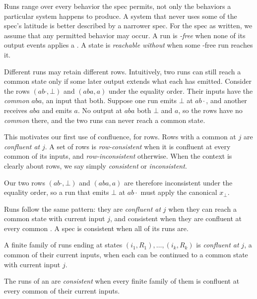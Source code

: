 Runs range over every behavior the spec permits, not only the behaviors a
particular system happens to produce.  A system that never uses some of the
spec's latitude is better described by a narrower spec.  For the spec as
written, we assume that any permitted behavior may occur.  A run is
\emph{\commitment-free} when none of its output events applies a
\commitment.  A state is \emph{reachable without \commitment} when some
\commitment-free run reaches it.

Different runs may retain different rows.  Intuitively, two runs can still
reach a common state only if some later output extends what each has emitted.
Consider the rows $(ab\cdot,\bot)$ and $(aba,a)$ under the equality order.
Their inputs have the \emph{common \indesc} $aba$, an input that \inrel both.
Suppose one run emits $\bot$ at $ab\cdot$, and another receives $aba$ and
emits $a$.  No output at $aba$ \outrel both $\bot$ and $a$, so the rows have
no \emph{common \outnoun} there, and the two runs can never reach a common
state.

This motivates our first use of confluence, for rows.  Rows with a common
\outnoun at $j$ are \emph{confluent at} $j$.  A set of rows is
\emph{row-consistent} when it is confluent at every common \indesc of its
inputs, and \emph{row-inconsistent} otherwise.  When the context is clearly
about rows, we say simply \emph{consistent} or \emph{inconsistent}.

Our two rows $(ab\cdot,\bot)$ and $(aba,a)$ are therefore inconsistent under the
equality order, so a run that emits $\bot$ at $ab\cdot$ must apply the canonical \commitment $x_\bot$.

Runs follow the same pattern: they are \emph{confluent at} $j$ when they can
reach a common state with current input $j$, and consistent when they are
confluent at every common \indesc.  A spec is consistent when all of its
runs are.

\begin{definition}
\label{def:confluence}
A finite family of runs ending at states $(i_1,R_1),\ldots,(i_k,R_k)$ is \emph{confluent at} $j$, a common \indesc of their current inputs, when each can be continued to a common state with current input $j$.
\end{definition}

\begin{definition}
\label{def:consistency}
The runs of an \spectype are \emph{consistent} when every finite family of
them is confluent at every common \indesc of their current inputs.
\end{definition}

